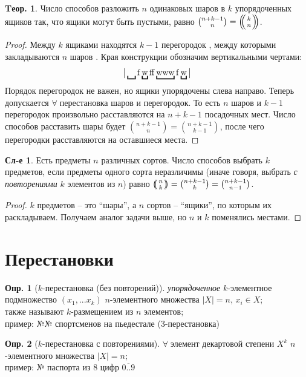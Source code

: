 \documentclass[a4paper,12pt]{article}
\numberwithin{figure}{section}
\theoremstyle{definition}
\newtheorem{definition}{Опр.}[section]
\theoremstyle{definition}
\newtheorem{theorem}{Tеор.}[section]
\newtheorem*{corollary}{Сл-е} %
\def\iiany{$\forall\;$}
\begin{document}
\begin{theorem}
	Число способов разложить $n$ одинаковых шаров в $k$ упорядоченных ящиков так, что ящики могут быть пустыми, равно $\binom{n+k-1}{n} = \mbinom{k}{n}$.
\end{theorem}
\begin{proof}
	Между $k$ ящиками \jjc \; находятся $k-1$ перегородок \jjf, между которыми закладываются $n$ шаров \jjw. Края конструкции обозначим вертикальными чертами: \[ \big|
	\underbracket{\quad} \iif \underbracket{\iiw} \iif \iif
	\underbracket{\iiw\iiw\iiw} \iif \underbracket{\iiw}
	\big| \]
	Порядок перегородок не важен, но ящики упорядочены слева направо.
	Теперь допускается \iiany перестановка шаров и перегородок. То есть $n$ шаров и $k-1$ перегородок произвольно расставляются на $n+k-1$ посадочных мест. Число способов расставить шары будет $\binom{n+k-1}{n} = \binom{n+k-1}{k-1}$, после чего перегородки расставляются на оставшиеся места.
\end{proof}


\begin{corollary}
	Есть предметы $n$ различных сортов. Число способов выбрать $k$ предметов, если предметы одного сорта неразличимы (иначе говоря, выбрать \textit{с повторениями} $k$ элементов из $n$) равно $\mbinom{n}{k} = \binom{n+k-1}{k} = \binom{n+k-1}{n-1}$.
\end{corollary}
\begin{proof}
	$k$ предметов -- это ``шары'', а $n$ сортов -- ``ящики'', по которым их раскладываем. Получаем аналог задачи выше, но $n$ и $k$ поменялись местами.
\end{proof}



\section{Перестановки}


\begin{definition}[$k$-перестановка (без повторений)]
	\textit{упорядоченное} $k$-элементное подмножество $(x_1,...x_k)$ $n$-элементного множества $|X|=n$, $x_i \in X$; \\
	также называют $k$-размещением из $n$ элементов; \\
	пример: №№ спортсменов на пьедестале (3-перестановка)
\end{definition}

\begin{definition}[$k$-перестановка с повторениями]
	\iiany элемент декартовой степени $X^k$ $n$-элементного множества $|X|=n$; \\
	пример: № паспорта из 8 цифр $\overline{0..9}$
\end{definition}
\end{document}
